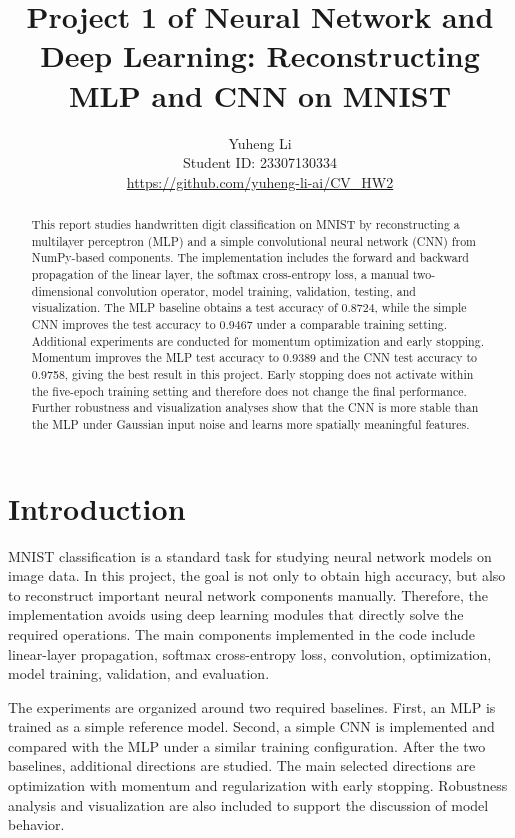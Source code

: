 \documentclass[10pt,twocolumn]{article}
\title{Project 1 of Neural Network and Deep Learning: Reconstructing MLP and CNN on MNIST}
\author{Yuheng Li\\Student ID: 23307130334\\\url{https://github.com/yuheng-li-ai/CV_HW2}}
\date{}
\begin{document}
\maketitle

\begin{abstract}
This report studies handwritten digit classification on MNIST by reconstructing a multilayer perceptron (MLP) and a simple convolutional neural network (CNN) from NumPy-based components. The implementation includes the forward and backward propagation of the linear layer, the softmax cross-entropy loss, a manual two-dimensional convolution operator, model training, validation, testing, and visualization. The MLP baseline obtains a test accuracy of 0.8724, while the simple CNN improves the test accuracy to 0.9467 under a comparable training setting. Additional experiments are conducted for momentum optimization and early stopping. Momentum improves the MLP test accuracy to 0.9389 and the CNN test accuracy to 0.9758, giving the best result in this project. Early stopping does not activate within the five-epoch training setting and therefore does not change the final performance. Further robustness and visualization analyses show that the CNN is more stable than the MLP under Gaussian input noise and learns more spatially meaningful features.
\end{abstract}

\section{Introduction}
MNIST classification is a standard task for studying neural network models on image data. In this project, the goal is not only to obtain high accuracy, but also to reconstruct important neural network components manually. Therefore, the implementation avoids using deep learning modules that directly solve the required operations. The main components implemented in the code include linear-layer propagation, softmax cross-entropy loss, convolution, optimization, model training, validation, and evaluation.

The experiments are organized around two required baselines. First, an MLP is trained as a simple reference model. Second, a simple CNN is implemented and compared with the MLP under a similar training configuration. After the two baselines, additional directions are studied. The main selected directions are optimization with momentum and regularization with early stopping. Robustness analysis and visualization are also included to support the discussion of model behavior.
\end{document}

